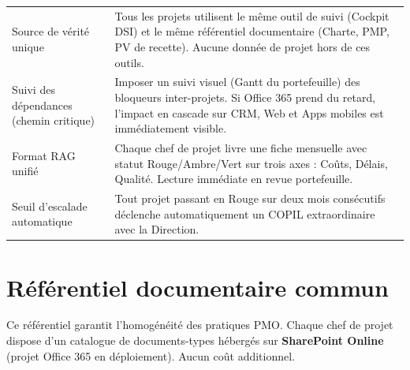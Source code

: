 \documentclass[11pt,a4paper,oneside]{report}
\begin{document}
\vspace{4pt}
\begin{center}
\renewcommand{\arraystretch}{1.5}
\begin{tabularx}{\textwidth}{L{4.5cm} L{9.5cm}}
\toprule
{}
 &  \\
\midrule
Source de vérité unique & Tous les projets utilisent le même outil de suivi (Cockpit DSI) et le même référentiel documentaire (Charte, PMP, PV de recette). Aucune donnée de projet hors de ces outils. \\
Suivi des dépendances (chemin critique) & Imposer un suivi visuel (Gantt du portefeuille) des bloqueurs inter-projets. Si Office 365 prend du retard, l'impact en cascade sur CRM, Web et Apps mobiles est immédiatement visible. \\
Format RAG unifié & Chaque chef de projet livre une fiche mensuelle avec statut Rouge/Ambre/Vert sur trois axes : Coûts, Délais, Qualité. Lecture immédiate en revue portefeuille. \\
Seuil d'escalade automatique & Tout projet passant en Rouge sur deux mois consécutifs déclenche automatiquement un COPIL extraordinaire avec la Direction. \\
\bottomrule
\end{tabularx}
\end{center}

\newpage
\section{Référentiel documentaire commun}

\begin{finding}
Ce référentiel garantit l'homogénéité des pratiques PMO. Chaque chef de projet dispose d'un catalogue de documents-types hébergés sur \textbf{SharePoint Online} (projet Office 365 en déploiement). Aucun coût additionnel.
\end{finding}
\end{document}
